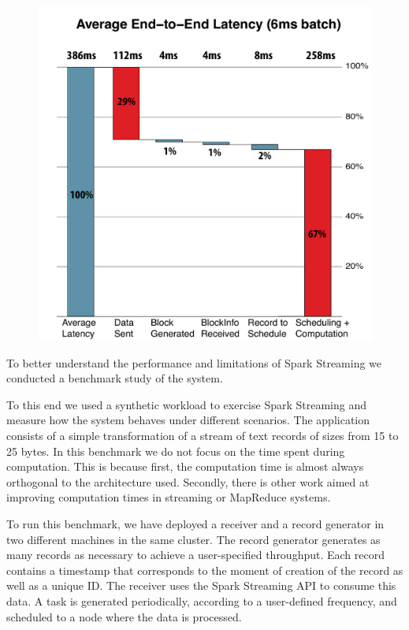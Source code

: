 \begin{figure}[t!]
  \begin{center}
    \includegraphics[scale=0.40]{images_graphs/waterfall/6ms_time_breakdown.pdf}
  \end{center}
  \caption{}
  \label{fig:SparkStreaming_time_breakdown}
\end{figure}

To better understand the performance and limitations of Spark Streaming we conducted a benchmark study of the system.

To this end we used a synthetic workload to exercise Spark Streaming and measure how the system behaves under different scenarios.
The application consists of a simple transformation of a stream of text records of sizes from 15 to 25 bytes.
In this benchmark we do not focus on the time spent during computation.
This is because first, the computation time is almost always orthogonal to the architecture used.
Secondly, there is other work aimed at improving computation times in streaming or MapReduce systems.

To run this benchmark, we have deployed a receiver and a record generator in two different machines in the same cluster. 
The record generator generates as many records as necessary to achieve a user-specified throughput.
Each record contains a timestamp that corresponds to the moment of creation of the record as well as a unique ID.
The receiver uses the Spark Streaming API to consume this data. 
A task is generated periodically, according to a user-defined frequency, and scheduled to a node where the data is processed.

